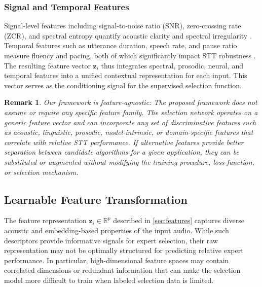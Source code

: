 \documentclass[journal]{IEEEtran}
\newtheorem{remark}{Remark}
\begin{document}
    \subsubsection{Signal and Temporal Features}
    Signal-level features including signal-to-noise ratio (SNR), zero-crossing rate
    (ZCR), and spectral entropy quantify acoustic clarity and spectral
    irregularity \cite{schuller2013computational,eyben2015opensmile}. Temporal features
    such as utterance duration, speech rate, and pause ratio measure fluency and
    pacing, both of which significantly impact STT robustness
    \cite{ko2015audio,tripathi2020ttransducer}. The resulting feature vector $\mathbf{z}
    _{i}$ thus integrates spectral, prosodic, neural, and temporal features into
    a unified contextual representation for each input. This vector serves as the
    conditioning signal for the supervised selection function.

    \begin{remark}
        Our framework is feature-agnostic: The proposed framework does not
        assume or require any specific feature family. The selection network operates
        on a generic feature vector and can incorporate any set of discriminative
        features such as acoustic, linguistic, prosodic, model-intrinsic, or domain-specific
        features that correlate with relative STT performance. If alternative
        features provide better separation between candidate algorithms for a
        given application, they can be substituted or augmented without modifying
        the training procedure, loss function, or selection mechanism.
    \end{remark}

    \subsection{Learnable Feature Transformation}
    \label{subsec:feature_transformation}

    The feature representation $\mathbf{z}_{i}\in \mathbb{R}^{p}$ described in \cref{sec:features}
    captures diverse acoustic and embedding-based properties of the input audio.
    While such descriptors provide informative signals for expert selection, their
    raw representation may not be optimally structured for predicting relative expert
    performance. In particular, high-dimensional feature spaces may contain correlated
    dimensions or redundant information that can make the selection model more difficult
    to train when labeled selection data is limited.
\end{document}
